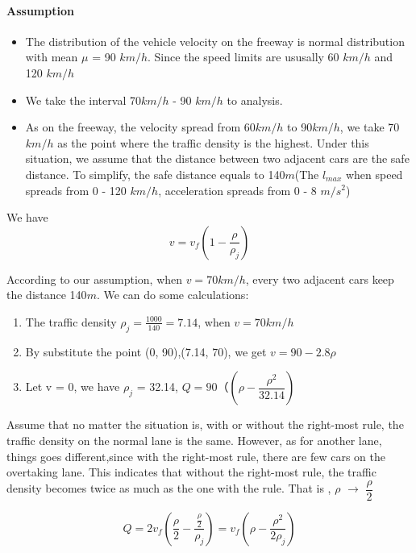 \paragraph{Assumption}
\begin{itemize}
\item The distribution of the
vehicle velocity on the freeway
is normal distribution with mean
$\mu$ = 90 $km/h$. Since the speed 
limits are ususally 60 $km/h$ and 120 $km/h$
\item We take the interval 70$km/h$ - 90 $km/h$
to analysis.
\item As on the freeway, the velocity spread from
60$km/h$ to 90$km/h$, we take 70$km/h$ as the point where the traffic density is the highest.
Under this situation, we assume that the distance between two adjacent cars are the
safe distance. To simplify, the safe distance
equals to 140$m$(The $l_{max}$ when speed spreads from 0 - 120 $km/h$, acceleration spreads from 0 - 8 $m/s^2$)

\end{itemize}

We have 
\begin{equation}
v = v_f(1 - \frac{\rho}{\rho_j})
\end{equation}

According to our assumption, when $v = 70km/h$, every 
two adjacent cars keep the distance 140$m$. We can do
some calculations:
\begin{enumerate}
\item The traffic density 
$\rho_j = \frac{1000}{140} = 7.14$, when $v = 70km/h$
\item By substitute the point (0, 90),(7.14, 70), 
we get $v = 90 - 2.8 \rho$
\item Let v = 0, we have
$\rho_j$ = 32.14,
$Q = 90（(\rho - \dfrac{\rho ^2}{32.14})$
\end{enumerate}

Assume that no matter the situation is, with or without the 
right-most rule,
the traffic density on the normal lane is the same. However,
as for another lane, things goes different,since
with the right-most rule, there are few cars on the overtaking
lane. This indicates that without the right-most rule,
the traffic density becomes twice as much as the one with the
rule.
That is , $\rho$ $\rightarrow$ $\dfrac{\rho}{2}$

\begin{displaymath}
Q = 2v_f(\dfrac{\rho}{2} -\dfrac{\frac{\rho}{2}}{\rho_j})
= v_f(\rho - \dfrac{\rho^2}{2\rho _j})
\end{displaymath}

